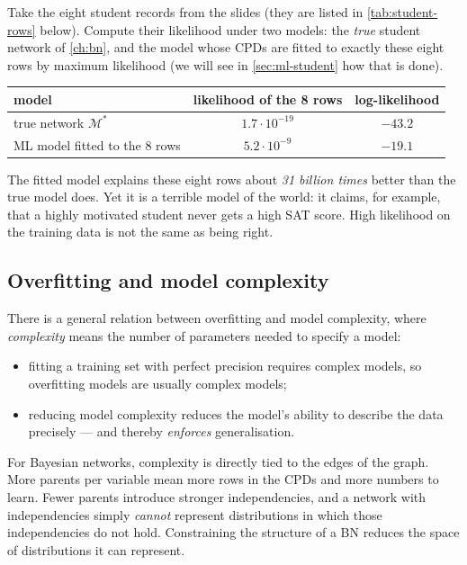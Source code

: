 \documentclass[11pt, oneside]{book}
\let\originalsubsection\subsection
\renewcommand{\subsection}{\Needspace{6\baselineskip}\originalsubsection}
\begin{document}
\begin{exbox}[title={Overfitting in the student network, with numbers}]
Take the eight student records from the slides (they are listed in
\cref{tab:student-rows} below). Compute their likelihood under two models:
the \emph{true} student network of \cref{ch:bn}, and the model whose CPDs are
fitted to exactly these eight rows by maximum likelihood (we will see in
\cref{sec:ml-student} how that is done).
\begin{center}
\small
\begin{tabular}{@{}lcc@{}}
\toprule
model & likelihood of the 8 rows & log-likelihood \\
\midrule
true network $\mathcal{M}^*$ & $1.7 \cdot 10^{-19}$ & $-43.2$ \\
ML model fitted to the 8 rows & $5.2 \cdot 10^{-9}$ & $-19.1$ \\
\bottomrule
\end{tabular}
\end{center}
The fitted model explains these eight rows about \emph{31 billion times} better
than the true model does. Yet it is a terrible model of the world: it claims,
for example, that a highly motivated student never gets a high SAT score.
High likelihood on the training data is not the same as being right.
\end{exbox}

\subsection{Overfitting and model complexity}

There is a general relation between overfitting and model complexity, where
\emph{complexity} means the number of parameters needed to specify a model:
\begin{itemize}
  \item fitting a training set with perfect precision requires complex models,
    so overfitting models are usually complex models;
  \item reducing model complexity reduces the model's ability to describe the
    data precisely --- and thereby \emph{enforces} generalisation.
\end{itemize}
For Bayesian networks, complexity is directly tied to the edges of the graph.
More parents per variable mean more rows in the CPDs and more numbers to learn.
Fewer parents introduce stronger independencies, and a network with
independencies simply \emph{cannot} represent distributions in which those
independencies do not hold. Constraining the structure of a BN reduces the
space of distributions it can represent.
\end{document}
